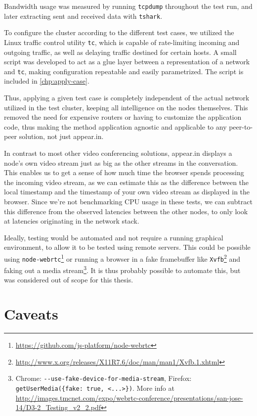 Bandwidth usage was measured by running \texttt{tcpdump} throughout the test run, and later extracting sent and received data with \texttt{tshark}.

To configure the cluster according to the different test cases, we utilized the Linux traffic control utility \texttt{tc}, which is capable of rate-limiting incoming and outgoing traffic, as well as delaying traffic destined for certain hosts. A small script was developed to act as a glue layer between a representation of a network and \texttt{tc}, making configuration repeatable and easily parametrized. The script is included in \autoref{chp:apply-case}.

Thus, applying a given test case is completely independent of the actual network utilized in the test cluster, keeping all intelligence on the nodes themselves. This removed the need for expensive routers or having to customize the application code, thus making the method application agnostic and applicable to any peer-to-peer solution, not just appear.in.

In contrast to most other video conferencing solutions, appear.in displays a node's own video stream just as big as the other streams in the conversation. This enables us to get a sense of how much time the browser spends processing the incoming video stream, as we can estimate this as the difference between the local timestamp and the timestamp of your own video stream as displayed in the browser. Since we're not benchmarking CPU usage in these tests, we can subtract this difference from the observed latencies between the other nodes, to only look at latencies originating in the network stack.

Ideally, testing would be automated and not require a running graphical environment, to allow it to be tested using remote servers. This could be possible using \texttt{node-webrtc}\footnote{\url{https://github.com/js-platform/node-webrtc}} or running a browser in a fake framebuffer like \texttt{Xvfb}\footnote{\url{http://www.x.org/releases/X11R7.6/doc/man/man1/Xvfb.1.xhtml}} and faking out a media stream\footnote{Chrome: \texttt{-{}-use-fake-device-for-media-stream}, Firefox: \texttt{getUserMedia(\{fake: true, <...>\})}. More info at \url{http://images.tmcnet.com/expo/webrtc-conference/presentations/san-jose-14/D3-2_Testing_v2_2.pdf}}. It is thus probably possible to automate this, but was considered out of scope for this thesis.


\section{Caveats}

